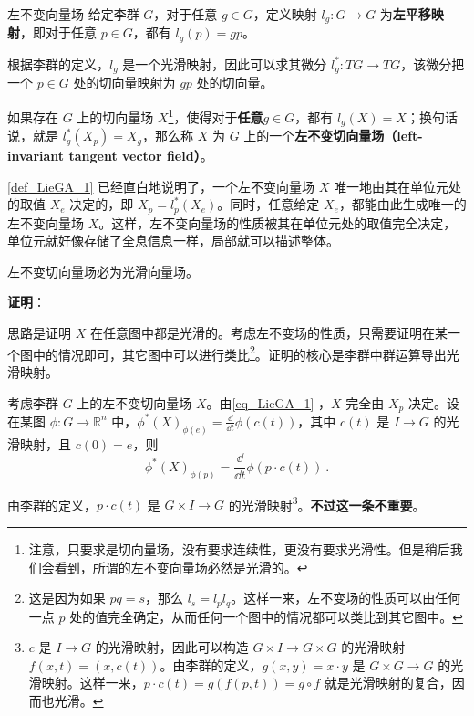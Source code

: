\begin{definition}{左不变向量场}\label{def_LieGA_1}
给定李群 $G$，对于任意 $g\in G$，定义映射 $l_g:G\to G$ 为\textbf{左平移映射}，即对于任意 $p\in G$，都有 $l_g(p)=gp$。

根据李群的定义，$l_g$ 是一个光滑映射，因此可以求其微分 $l_{g}^*:TG\to TG$，该微分把一个 $p\in G$ 处的切向量映射为 $gp$ 处的切向量。

如果存在 $G$ 上的切向量场 $X$\footnote{注意，只要求是切向量场，没有要求连续性，更没有要求光滑性。但是稍后我们会看到，所谓的左不变向量场必然是光滑的。}，使得对于\textbf{任意}$g\in G$，都有 $l_g(X)=X$；换句话说，就是 $l_{g}^*(X_p)=X_g$，那么称 $X$ 为 $G$ 上的一个\textbf{左不变切向量场（left-invariant tangent vector field）}。
\end{definition}

\autoref{def_LieGA_1} 已经直白地说明了，一个左不变向量场 $X$ 唯一地由其在单位元处的取值 $X_e$ 决定的，即 $X_p=l_{p}^*(X_e)$。同时，任意给定 $X_e$，都能由此生成唯一的左不变向量场 $X$。这样，左不变向量场的性质被其在单位元处的取值完全决定，单位元就好像存储了全息信息一样，局部就可以描述整体。

\begin{theorem}{}
左不变切向量场必为光滑向量场。
\end{theorem}

\textbf{证明}：




思路是证明 $X$ 在任意图中都是光滑的。考虑左不变场的性质，只需要证明在某一个图中的情况即可，其它图中可以进行类比\footnote{这是因为如果 $pq=s$，那么 $l_{s}=l_pl_q$。这样一来，左不变场的性质可以由任何一点 $p$ 处的值完全确定，从而任何一个图中的情况都可以类比到其它图中。}。证明的核心是李群中群运算导出光滑映射。

考虑李群 $G$ 上的左不变切向量场 $X$。由\autoref{eq_LieGA_1} ，$X$ 完全由 $X_p$ 决定。设在某图 $\phi: G\to\mathbb{R}^n$ 中，$\phi^*(X)_{\phi(e)}=\frac{\dd }{\dd t}\phi(c(t))$，其中 $c(t)$ 是 $I\to G$ 的光滑映射，且 $c(0)=e$，则
\begin{equation}\label{eq_LieGA_2}
\phi^*(X)_{\phi(p)}=\frac{\dd}{\dd t}\phi(p\cdot c(t))~.
\end{equation}

由李群的定义，$p\cdot c(t)$ 是 $G\times I\to G$ 的光滑映射\footnote{$c$ 是 $I\to G$ 的光滑映射，因此可以构造 $G\times I\to G\times G$ 的光滑映射 $f(x, t)=(x, c(t))$。由李群的定义，$g(x, y)=x\cdot y$ 是 $G\times G\to G$ 的光滑映射。这样一来，$p\cdot c(t)=g(f(p, t))=g\circ f$ 就是光滑映射的复合，因而也光滑。}。\textbf{不过这一条不重要}。


